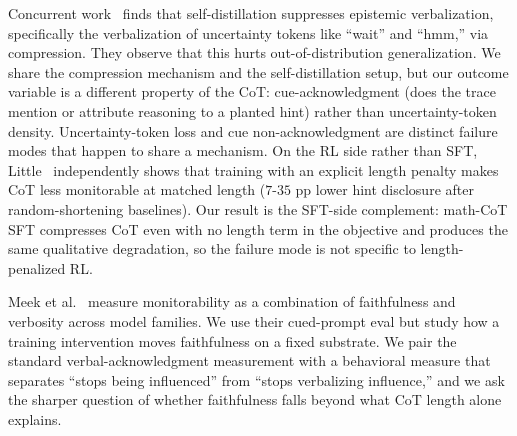 \documentclass{article}
\begin{document}
Concurrent work~\cite{selfdistill2026} finds that self-distillation suppresses
epistemic verbalization, specifically the verbalization of uncertainty tokens
like ``wait'' and ``hmm,'' via compression. They observe that this hurts
out-of-distribution generalization. We share the compression mechanism and
the self-distillation setup, but our outcome variable is a different property
of the CoT: cue-acknowledgment (does the trace mention or attribute reasoning
to a planted hint) rather than uncertainty-token density. Uncertainty-token
loss and cue non-acknowledgment are distinct failure modes that happen to
share a mechanism. On the RL side rather than SFT, Little~\cite{little2026lengthpen}
independently shows that training with an explicit length penalty makes CoT
less monitorable at matched length ($7$-$35$ pp lower hint disclosure after
random-shortening baselines). Our result is the SFT-side complement: math-CoT
SFT compresses CoT even with no length term in the objective and produces the
same qualitative degradation, so the failure mode is not specific to
length-penalized RL.

Meek et al.~\cite{meek2025} measure monitorability as a combination of
faithfulness and verbosity across model families. We use their cued-prompt eval
but study how a training intervention moves faithfulness on a fixed substrate.
We pair the standard verbal-acknowledgment measurement with a behavioral
measure that separates ``stops being influenced'' from ``stops verbalizing
influence,'' and we ask the sharper question of whether faithfulness falls
beyond what CoT length alone explains.
\end{document}
